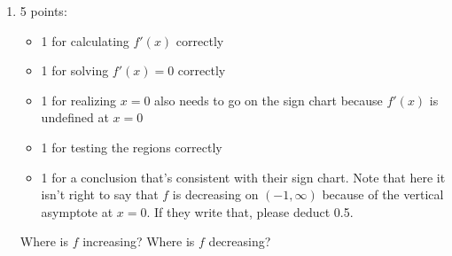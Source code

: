 \documentclass{article}
\begin{document}
\begin{enumerate}
\begin{enumerate}
    \begin{problem}[\stretch{0.5}]
      Find $\displaystyle \lim_{x \to \infty} f(x)$. 
    \end{problem}

    \begin{solution}
      As $x$ goes to infinity, the numerator of $\frac{e^{-x}}{x}$ approaches zero
      and the denominator goes to infinity, so $\lim\limits_{x\to\infty}f(x)=0$.
    \end{solution}

  \item \label{e^-x/x-increasing-decreasing}

    \begin{grading}
      5 points:
      \begin{itemize}[nosep]
      \item 1 for calculating $f'(x)$ correctly
      \item 1 for solving $f'(x) = 0$ correctly
      \item 1 for realizing $x = 0$ also needs to go on the sign chart because $f'(x)$ is undefined at $x = 0$
      \item 1 for testing the regions correctly
      \item 1 for a conclusion that's consistent with their sign chart. Note that here it isn't right to say that $f$ is decreasing on $(-1, \infty)$ because of the vertical asymptote at $x = 0$. If they write that, please deduct 0.5. 
      \end{itemize}
    \end{grading}

    \begin{problem}[\nstretch{1.5}]
      Where is $f$ increasing? Where is $f$ decreasing?
    \end{problem}


\end{enumerate}
\end{enumerate}
\end{document}

